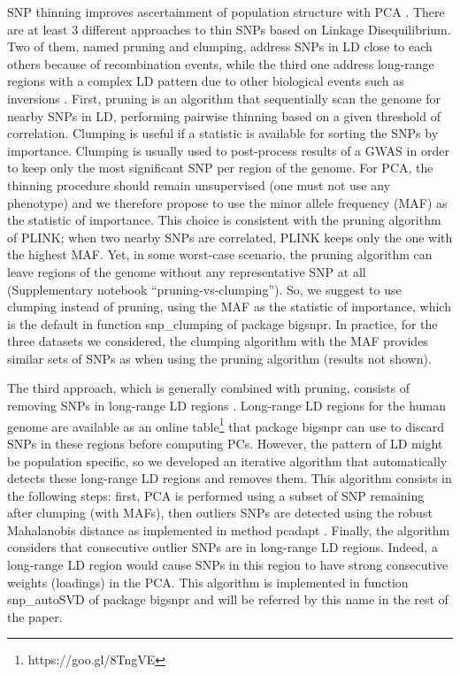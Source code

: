 \documentclass{bioinfo}
\begin{document}
\begin{methods}
SNP thinning improves ascertainment of population structure with PCA \cite[]{Abdellaoui2013}. There are at least 3 different approaches to thin SNPs based on Linkage Disequilibrium. Two of them, named pruning and clumping, address SNPs in LD close to each others because of recombination events, while the third one address long-range regions with a complex LD pattern due to other biological events such as inversions \cite[]{Price2008}. 
First, pruning is an algorithm that sequentially scan the genome for nearby SNPs in LD, performing pairwise thinning based on a given threshold of correlation.
{\color{red}
Clumping is useful if a statistic is available for sorting the SNPs by importance. Clumping is usually used to post-process results of a GWAS in order to keep only the most significant SNP per region of the genome. 
For PCA, the thinning procedure should remain unsupervised (one must not use any phenotype) and we therefore propose to use the minor allele frequency (MAF) as the statistic of importance. 
This choice is consistent with the pruning algorithm of PLINK; when two nearby SNPs are correlated, PLINK keeps only the one with the highest MAF.
Yet, in some worst-case scenario, the pruning algorithm can leave regions of the genome without any representative SNP at all (Supplementary notebook ``pruning-vs-clumping''). 
So, we suggest to use clumping instead of pruning, using the MAF as the statistic of importance, which is the default in function snp\_clumping of package bigsnpr. In practice, for the three datasets we considered, the clumping algorithm with the MAF provides similar sets of SNPs as when using the pruning algorithm (results not shown).
}

The third approach, which is generally combined with pruning, consists of removing SNPs in long-range LD regions \cite[]{Price2008}. Long-range LD regions for the human genome are available as an online table\footnote{https://goo.gl/8TngVE} that package bigsnpr can use to discard SNPs in these regions before computing PCs. 
However, the pattern of LD might be population specific, so we developed an iterative algorithm that automatically detects these long-range LD regions and removes them. This algorithm consists in the following steps: first, PCA is performed using a subset of SNP remaining after clumping (with MAFs), then outliers SNPs are detected using the robust Mahalanobis distance as implemented in method pcadapt \cite[]{Luu2017}. Finally, the algorithm considers that consecutive outlier SNPs are in long-range LD regions. Indeed, a long-range LD region would cause SNPs in this region to have strong consecutive weights (loadings) in the PCA. This algorithm is implemented in function snp\_autoSVD of package bigsnpr and will be referred by this name in the rest of the paper.



\end{methods}
\end{document}
